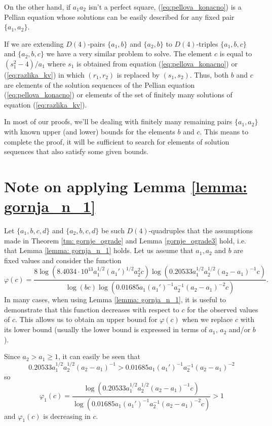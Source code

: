 \documentclass[12pt]{amsart}%
\theoremstyle{definition}
\theoremstyle{remark}
\theoremstyle{plain}
\begin{document}
On the other hand, if $a_1a_2$ isn't a perfect square, (\ref{eq:pellova_konacno}) is a Pellian equation whose solutions can be easily described for any fixed pair $\{a_1,a_2\}$. 

If we are extending $D(4)$-pairs $\{a_1,b\}$ and $\{a_2,b\}$ to $D(4)$-triples $\{a_1,b,c\}$ and $\{a_2,b,c\}$ we have a very similar problem to solve. The element $c$ is equal to $(s_1^2-4)/a_1$ where $s_1$ is obtained from equation (\ref{eq:pellova_konacno}) or (\ref{eq:razlika_kv}) in which $(r_1,r_2)$ is replaced by $(s_1,s_2)$. Thus, both $b$ and $c$ are elements of the solution sequences of the Pellian equation (\ref{eq:pellova_konacno}) or elements of the set of finitely many solutions of equation (\ref{eq:razlika_kv}).

In most of our proofs, we'll be dealing with finitely many remaining pairs $\{a_1,a_2\}$ with known upper (and lower) bounds for the elements $b$ and $c$. This means to complete the proof, it will be sufficient to search for elements of solution sequences that also satisfy some given bounds.


\section{Note on applying Lemma \ref{lemma: gornja_n_1}}\label{sekcija_treca}

Let $\{a_1,b,c,d\}$ and $\{a_2,b,c,d\}$ be such $D(4)$-quadruples that the assumptions made in Theorem \ref{tm: gornje_ograde} and Lemma \ref{gornje_ograde3} hold, i.e. that Lemma \ref{lemma: gornja_n_1} holds. Let us assume that $a_1,a_2$ and $b$ are fixed values and consider the function
$$
\varphi(c)=
\frac{8\log(8.4034 \cdot 10^{13} a_1^{1/2}(a_1')^{1/2}a_2^2c)\log(0.20533a_1^{1/2}a_2^{1/2}(a_2-a_1)^{-1}c)}{\log(bc)\log(0.01685a_1(a_1')^{-1}a_2^{-1}(a_2-a_1)^{-2}c)}.$$
In many cases, when using Lemma \ref{lemma: gornja_n_1}, it is useful to demonstrate that this function decreases with respect to
 $c$  for the observed values of 
 $c$. This allows us to obtain an upper bound for $\varphi(c)$ when we replace $c$ with its lower bound (usually the lower bound is expressed in terms of $a_1$, $a_2$ and/or $b$).

Since $a_2>a_1\geq 1$, it can easily be seen that $$0.20533a_1^{1/2}a_2^{1/2}(a_2-a_1)^{-1}>0.01685a_1(a_1')^{-1}a_2^{-1}(a_2-a_1)^{-2}$$ so
$$\varphi_1(c)=\frac{\log(0.20533a_1^{1/2}a_2^{1/2}(a_2-a_1)^{-1}c)}{\log(0.01685a_1(a_1')^{-1}a_2^{-1}(a_2-a_1)^{-2}c)}>1$$
and $\varphi_1(c)$ is decreasing in $c$. 
\end{document}

